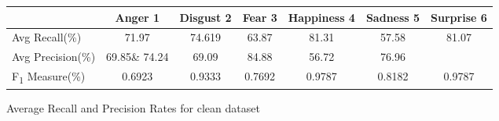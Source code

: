 \begin{figure}[h]
\begin{center}
\caption{Average Recall and Precision Rates for clean dataset}
\begin{tabular}{ | l || c | c | c | c | c | c | }
    \hline
          & Anger 1 & Disgust 2 & Fear 3 & Happiness 4 & Sadness 5 & Surprise 6 \\ \hline \hline
        Avg Recall(\%) & 71.97 & 74.619 & 63.87 & 81.31 & 57.58 & 81.07 \\ \hline
        Avg Precision(\%) & 69.85\& 74.24 & 69.09  & 84.88 & 56.72 & 76.96 \\ \hline
        F\textsubscript{1} Measure(\%) & 0.6923 & 0.9333 & 0.7692 & 0.9787 & 0.8182 &
        0.9787 \\ \hline
    \end{tabular}
    \label{fig:averageRecall}
\end{center}
\end{figure}

